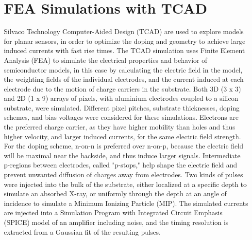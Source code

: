 \section{FEA Simulations with TCAD}
Silvaco Technology Computer-Aided Design (TCAD) are used to explore models for planar sensors, in order to optimize the doping and geometry to achieve large induced currents with fast rise times.
The TCAD simulation uses Finite Element Analysis (FEA) to simulate the electrical properties and behavior of semiconductor models, in this case by calculating the electric field in the model, the weighting fields of the individual electrodes, and the current induced at each electrode due to the motion of charge carriers in the substrate.
Both 3D (3 x 3) and 2D (1 x 9) arrays of pixels, with aluminium electrodes coupled to a silicon substrate, were simulated.
Different pixel pitches, substrate thicknesses, doping schemes, and bias voltages were considered for these simulations.
Electrons are the preferred charge carrier, as they have higher mobility than holes and thus higher velocity, and larger induced currents, for the same electric field strength.
For the doping scheme, n-on-n is preferred over n-on-p, because the electric field will be maximal near the backside, and thus induce larger signals.
Intermediate p-regions between electrodes, called "p-stops," help shape the electric field and prevent unwanted diffusion of charges away from electrodes.
Two kinds of pulses were injected into the bulk of the substrate, either localized at a specific depth to simulate an absorbed X-ray, or uniformly through the depth at an angle of incidence to simulate a Minimum Ionizing Particle (MIP).
The simulated currents are injected into a Simulation Program with Integrated Circuit Emphasis (SPICE) model of an amplifier including noise, and the timing resolution is extracted from a Gaussian fit of the resulting pulses.



\micro\metre
